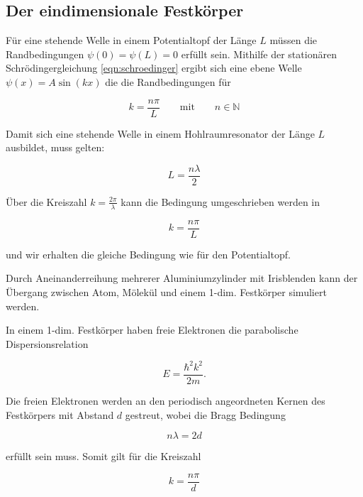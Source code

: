 \subsection{Der eindimensionale Festkörper}
\noindent
Für eine stehende Welle in einem Potentialtopf der Länge $L$ müssen die Randbedingungen $ \psi(0) = \psi(L) = 0$ erfüllt sein.
Mithilfe der stationären Schrödingergleichung \ref{eqn:schroedinger} ergibt sich eine ebene Welle  $\psi(x) = A \sin(kx)$ die die Randbedingungen für

\begin{equation}
  k = \frac{n \pi }{L} \qquad \text{mit} \qquad n \in \mathbb{N}
\end{equation}

\noindent
Damit sich eine stehende Welle in einem Hohlraumresonator der Länge $L$ ausbildet, muss gelten:

\begin{equation}
L = \frac{n\lambda}{2}
\end{equation}

\noindent
Über die Kreiszahl $k=\frac{2\pi}{\lambda}$ kann die Bedingung umgeschrieben werden in 

\begin{equation}
  k = \frac{n \pi }{L} 
\end{equation}

\noindent
und wir erhalten die gleiche Bedingung wie für den Potentialtopf.


\noindent
Durch Aneinanderreihung mehrerer Aluminiumzylinder mit Irisblenden kann der Übergang zwischen Atom, Mölekül und einem 1-dim. Festkörper simuliert werden.

\noindent
In einem 1-dim. Festkörper haben freie Elektronen die parabolische Dispersionsrelation

\begin{equation*}
  E = \frac{\hbar^2 k^2}{2m}.
\end{equation*}

\noindent
Die freien Elektronen werden an den periodisch angeordneten Kernen des Festkörpers mit Abstand $d$ gestreut, wobei die Bragg Bedingung

\begin{equation*}
  n \lambda = 2d 
\end{equation*}

\noindent
erfüllt sein muss. Somit gilt für die Kreiszahl

\begin{equation*}
k = \frac{n \pi}{d} 
\end{equation*}

